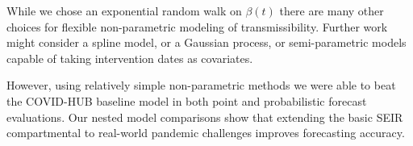 \documentclass[11pt]{amsart}
\begin{document}
While we chose an exponential random walk on $\beta(t)$ there are many other choices for flexible non-parametric modeling of transmissibility. Further work might consider a spline model, or a Gaussian process, or semi-parametric models capable of taking intervention dates as covariates. 

However, using relatively simple non-parametric methods we were able to beat the COVID-HUB baseline model in both point and probabilistic forecast evaluations. Our nested model comparisons show that extending the basic SEIR compartmental to real-world pandemic challenges improves forecasting accuracy. 

\newpage



\end{document}
